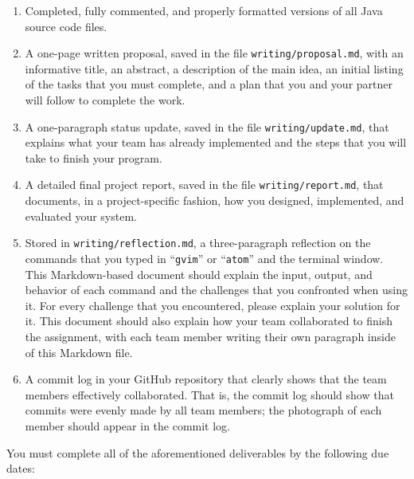 \documentclass[11pt]{article}
\newcommand{\reflection}{\lstinline{writing/reflection.md}}
\newcommand{\command}[1]{``\lstinline{#1}''}
\newcommand{\program}[1]{\lstinline{#1}}
\begin{document}
\begin{enumerate}

  \setlength{\itemsep}{0in}

  \item Completed, fully commented, and properly formatted versions of all Java source code files.

  \item A one-page written proposal, saved in the file \program{writing/proposal.md}, with an informative title, an
    abstract, a description of the main idea, an initial listing of the tasks that you must complete, and a plan that
    you and your partner will follow to complete the work.

  \item A one-paragraph status update, saved in the file \program{writing/update.md}, that explains what your team has
    already implemented and the steps that you will take to finish your program.

  \item A detailed final project report, saved in the file \program{writing/report.md}, that documents, in a
    project-specific fashion, how you designed, implemented, and evaluated your system.

  \item Stored in \reflection{}, a three-paragraph reflection on the commands that you typed in \command{gvim} or
    \command{atom} and the terminal window. This Markdown-based document should explain the input, output, and behavior
    of each command and the challenges that you confronted when using it. For every challenge that you encountered,
    please explain your solution for it. This document should also explain how your team collaborated to finish the
    assignment, with each team member writing their own paragraph inside of this Markdown file.

  \item A commit log in your GitHub repository that clearly shows that the team members effectively collaborated. That is,
    the commit log should show that commits were evenly made by all team members; the photograph of each member should
    appear in the commit log.

\end{enumerate}

\noindent
You must complete all of the aforementioned deliverables by the following due dates:
\end{document}
